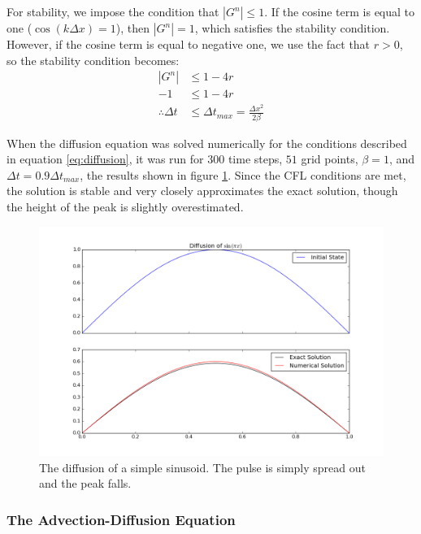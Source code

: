 \documentclass[twocolumn]{article}
\begin{document}
For stability, we impose the condition that $|G^n| \leq 1$. If the
cosine term is equal to one ($\cos(k \Delta x) = 1$), then $|G^n| =
1$, which satisfies the stability condition. However, if the cosine
term is equal to negative one, we use the fact that $r > 0$, so the
stability condition becomes:
\begin{equation}
  \begin{aligned}
    |G^n| &\leq 1 - 4 r \\
    - 1 &\leq 1 - 4 r \\
    \therefore \Delta t &\leq \Delta t_{max} = \frac{\Delta x^2}{2 \beta}
  \end{aligned}
\end{equation}

When the diffusion equation was solved numerically for the conditions
described in equation \ref{eq:diffusion}, it was run for $300$ time
steps, $51$ grid points, $\beta = 1$, and $\Delta t = 0.9 \Delta
t_{max}$, the results shown in figure \ref{fig:diffusion}. Since the
CFL conditions are met, the solution is stable and very closely
approximates the exact solution, though the height of the peak is
slightly overestimated.

\begin{figure}
  \includegraphics[width=\linewidth]{diffusion.png}
  \caption{
    The diffusion of a simple sinusoid. The pulse is simply spread out
    and the peak falls.
  }
  \label{fig:diffusion}
\end{figure}

\subsubsection{The Advection-Diffusion Equation}
\end{document}
